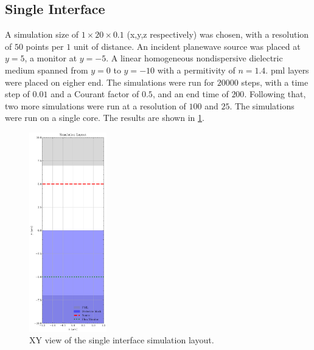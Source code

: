 \subsection{Single Interface}
A simulation size of $1 \times 20 \times 0.1$ (x,y,z respectively) was chosen, with a resolution of $50$ points per $1$ unit of distance. An incident planewave source was placed at $y=5$, a monitor at $y=-5$. A linear homogeneous nondispersive dielectric medium spanned from $y=0$ to $y=-10$ with a permitivity of $n=1.4$. \gls{pml} layers were placed on eigher end. The simulations were run for $20000$ steps, with a time step of $0.01$ and a Courant factor of $0.5$, and an end time of $200$. Following that, two more simulations were run at a resolution of $100$ and $25$. The simulations were run on a single core. The results are shown in \cref{fig:layout-single-interface}.
\begin{figure}[H]\label{fig:layout-single-interface}
  \centering
  \includegraphics[width=0.3\textwidth]{obrazky-figures/sim-layout-si.pdf}
  \caption{XY view of the single interface simulation layout.}
\end{figure}



